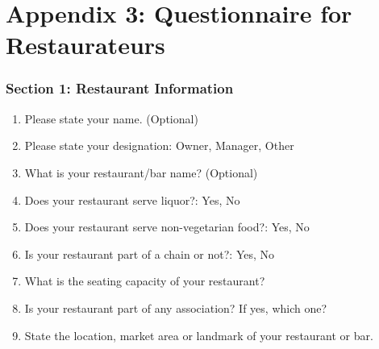\documentclass[a4paper, 12pt]{article}
\begin{document}
		\newpage
		\section*{Appendix 3: Questionnaire for Restaurateurs}
		\label {Appendix 3}
	
	\subsubsection* {Section 1: Restaurant Information}
		\begin {enumerate}[-,nosep]
		\item Please state your name. (Optional)
		\item Please state your designation: Owner, Manager, Other
		\item What is your restaurant/bar name? (Optional)
		\item Does your restaurant serve liquor?: Yes, No
		\item Does your restaurant serve non-vegetarian food?: Yes, No
		\item Is your restaurant part of a chain or not?:  Yes, No
		\item What is the seating capacity of your restaurant?
		\item Is your restaurant part of any association? If yes, which one?
		\item State the location, market area or landmark of your restaurant or bar.
		\end {enumerate}
		
\end{document}
